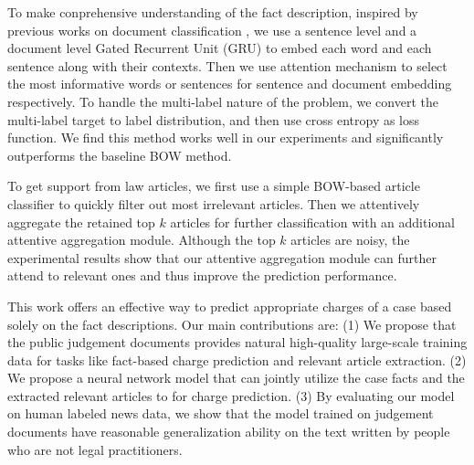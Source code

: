 To make conprehensive understanding of the fact description, inspired by previous works on document classification \cite{tang2015document,yang2016hierarchical}, we use a sentence level and a document level Gated Recurrent Unit (GRU) to embed each word and each sentence along with their contexts. 
Then we use attention mechanism to select the most informative words or sentences for sentence and document embedding respectively. 
To handle the multi-label nature of the problem, we convert the multi-label target to label distribution, and then use cross entropy as loss function. We find this method works well in our experiments and significantly outperforms the baseline BOW method.

To get support from law articles, we first use a simple BOW-based article classifier to quickly filter out most irrelevant articles. Then we attentively aggregate the retained top $k$ articles for further classification with an additional attentive aggregation module.
Although the top $k$ articles are noisy, the experimental results show that our attentive aggregation module can further attend to relevant ones and thus improve the prediction performance. 

This work offers an effective way to predict appropriate charges of a case based solely on the fact descriptions. Our main contributions are: (1) We propose that the public judgement documents provides natural high-quality large-scale training data for tasks like fact-based charge prediction and relevant article extraction. (2) We propose a neural network model that can jointly utilize the case facts and the extracted relevant articles to for charge prediction. (3) By evaluating our model on human labeled news data, we show that the model trained on judgement documents have reasonable generalization ability on the text written by people who are not legal practitioners. 



